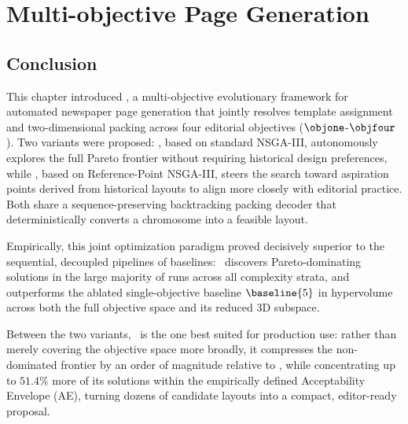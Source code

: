 \chapter{Multi-objective Page Generation}
\label{chapter:pagegen}













 

\section{Conclusion}

This chapter introduced \methodNameGeneral, a multi-objective evolutionary framework for automated newspaper page generation that jointly resolves template assignment and two-dimensional packing across four editorial objectives ($\objone$-$\objfour$). Two variants were proposed: \methodNameUniform, based on standard NSGA-III, autonomously explores the full Pareto frontier without requiring historical design preferences, while \methodName, based on Reference-Point NSGA-III, steers the search toward aspiration points derived from historical layouts to align more closely with editorial practice. 
Both share a sequence-preserving backtracking packing decoder that deterministically converts a chromosome into a feasible layout.

Empirically, this joint optimization paradigm proved decisively superior to the sequential, decoupled pipelines of baselines: \methodNameUniform\ discovers Pareto-dominating solutions in the large majority of runs across all complexity strata, and outperforms the ablated single-objective baseline $\baseline{5}$ in hypervolume across both the full objective space and its reduced 3D subspace. 

Between the two variants, \methodName\ is the one best suited for production use: rather than merely covering the objective space more broadly, it compresses the non-dominated frontier by an order of magnitude relative to \methodNameUniform, while concentrating up to $51.4\%$ more of its solutions within the empirically defined Acceptability Envelope (AE), turning dozens of candidate layouts into a compact, editor-ready proposal.

